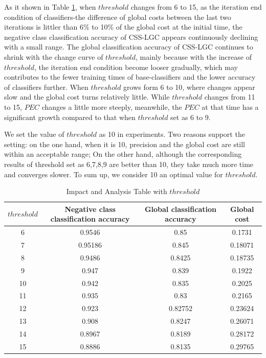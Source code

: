 \documentclass{svjour3}                     %
\begin{document}

As it shown in Table \ref{tab:threshold}, when $threshold$ changes from 6 to 15, as the iteration end condition of classifiers-the difference of global costs between the last two iterations is littler than 6\% to 10\% of the global cost at the initial time, the negative class classification accuracy of CSS-LGC appears continuously declining with a small range. The global classification accuracy of CSS-LGC continues to shrink with the change curve of $threshold$, mainly because with the increase of $threshold$, the iteration end condition become looser gradually, which may contributes to the fewer training times of base-classifiers and the lower accuracy of classifiers further. When $threshold$ grows form 6 to 10, where changes appear slow and the global cost turns relatively little. While $threshold$ changes from 11 to 15, $PEC$ changes a little more steeply, meanwhile, the $PEC$ at that time has a significant growth compared to that when $threshold$ set as 6 to 9.

We set the value of $threshold$ as 10 in experiments. Two reasons support the setting: on the one hand, when it is 10, precision and the global cost are still within an acceptable range; On the other hand, although the corresponding results of threshold set as 6,7,8,9 are better than 10, they take much more time and converges slower. To sum up, we consider 10 an optimal value for $threshold$.

\begin{table}[htbp]
  \centering
    \begin{tabular}{cccc}
    \toprule
    $threshold$ & Negative class classification accuracy & Global classification accuracy & Global cost \\
    \midrule
    6     & 0.9546 & 0.85  & 0.1731 \\
    7     & 0.95186 & 0.845 & 0.18071 \\
    8     & 0.9486 & 0.8425 & 0.18735 \\
    9     & 0.947 & 0.839 & 0.1922 \\
    10    & 0.942 & 0.835 & 0.2025 \\
    11    & 0.935 & 0.83  & 0.2165 \\
    12    & 0.923 & 0.82752 & 0.23624 \\
    13    & 0.908 & 0.8247 & 0.26071 \\
    14    & 0.8967 & 0.8189 & 0.28172 \\
    15    & 0.8886 & 0.8135 & 0.29765 \\
    \bottomrule
    \end{tabular}
    \caption{Impact and Analysis Table with $threshold$}
  \label{tab:threshold}
\end{table}
\end{document}
